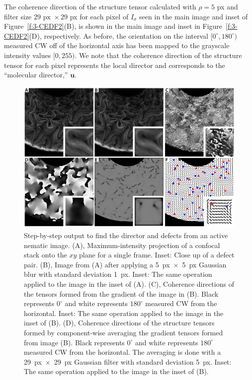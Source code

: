 The coherence direction of the structure tensor calculated with $\rho = 5$ px and filter size $29\textrm{ px } \times 29$ px for each pixel of $I_{\sigma}$ seen in the main image and inset of Figure~\ref{f:3-CEDF2}(B), is shown in the main image and inset in Figure~\ref{f:3-CEDF2}(D), respectively.
As before, the orientation on the interval $[0^{\circ}, 180^{\circ})$ measured CW off of the horizontal axis has been mapped to the grayscale intensity values $[0,255)$.
 We note that the coherence direction of the structure tensor for each pixel represents the local director and corresponds to the ``molecular director,'' $\mathbf{u}$.
\newpage
\begin{figure}[H]
  \centering
  \includegraphics{figures/C3/Ch3-Figs_CEDF2.png}
  \caption{Step-by-step output to find the director and defects from an active nematic image.
(A), Maximum-intensity projection of a confocal stack onto the $xy$ plane for a single frame.
Inset: Close up of a defect pair.
(B), Image from (A) after applying a 5~px~$\times$~5~px Gaussian blur with standard deviation 1~px.
Inset: The same operation applied to the image in the inset of (A).
(C), Coherence directions of the tensors formed from the gradient of the image in (B).
Black represents $0^{\circ}$ and white represents $180^{\circ}$ measured CW from the horizontal.
Inset: The same operation applied to the image in the inset of (B).
(D), Coherence directions of the structure tensors formed by component-wise averaging the gradient tensors formed from image (B).
Black represents $0^{\circ}$ and white represents $180^{\circ}$ measured CW from the horizontal.
The averaging is done with a 29~px~$\times$~29~px Gaussian filter with standard deviation 5~px.
Inset: The same operation applied to the image in the inset of (B).
}
\end{figure}
